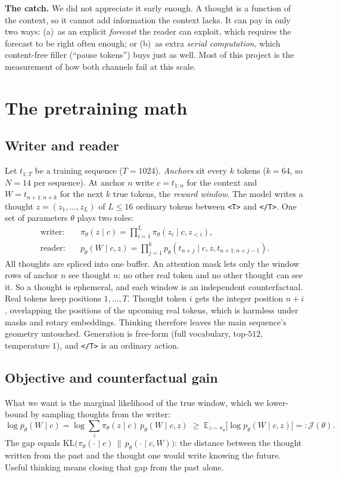 \documentclass[11pt]{article}
\newcommand{\tstart}{\texttt{<T>}}
\newcommand{\tend}{\texttt{</T>}}
\begin{document}
\textbf{The catch.} We did not appreciate it early enough. A thought is a function of the context, so it cannot add information the context lacks. It can pay in only two ways: (a)~as an explicit \emph{forecast} the reader can exploit, which requires the forecast to be right often enough; or (b)~as extra \emph{serial computation}, which content-free filler (``pause tokens'') buys just as well. Most of this project is the measurement of how both channels fail at this scale.

\section{The pretraining math}

\subsection{Writer and reader}
Let $t_{1:T}$ be a training sequence ($T=1024$). \emph{Anchors} sit every $k$ tokens ($k=64$, so $N=14$ per sequence). At anchor $n$ write $c=t_{1:n}$ for the context and $W=t_{n+1:n+k}$ for the next $k$ true tokens, the \emph{reward window}. The model writes a thought $z=(z_1,\dots,z_L)$ of $L\le 16$ ordinary tokens between \tstart{} and \tend. One set of parameters $\theta$ plays two roles:
\begin{align}
\text{writer:}\quad & \pi_\theta(z\mid c)=\prod_{i=1}^{L}\pi_\theta(z_i\mid c,z_{<i}),\\
\text{reader:}\quad & p_\theta(W\mid c,z)=\prod_{j=1}^{k}p_\theta(t_{n+j}\mid c,z,t_{n+1:n+j-1}).
\end{align}
All thoughts are spliced into one buffer. An attention mask lets only the window rows of anchor $n$ see thought $n$: no other real token and no other thought can see it. So a thought is ephemeral, and each window is an independent counterfactual. Real tokens keep positions $1,\dots,T$. Thought token $i$ gets the integer position $n+i$, overlapping the positions of the upcoming real tokens, which is harmless under masks and rotary embeddings. Thinking therefore leaves the main sequence's geometry untouched. Generation is free-form (full vocabulary, top-$512$, temperature $1$), and \tend{} is an ordinary action.

\subsection{Objective and counterfactual gain}
What we want is the marginal likelihood of the true window, which we lower-bound by sampling thoughts from the writer:
\begin{equation}
\log p_\theta(W\mid c)=\log\sum_z \pi_\theta(z\mid c)\,p_\theta(W\mid c,z)\;\ge\;\mathbb{E}_{z\sim\pi_\theta}\big[\log p_\theta(W\mid c,z)\big]=:\mathcal{J}(\theta).
\end{equation}
The gap equals $\mathrm{KL}\big(\pi_\theta(\cdot\mid c)\,\|\,p_\theta(\cdot\mid c,W)\big)$: the distance between the thought written from the past and the thought one would write knowing the future. Useful thinking means closing that gap from the past alone.
\end{document}
